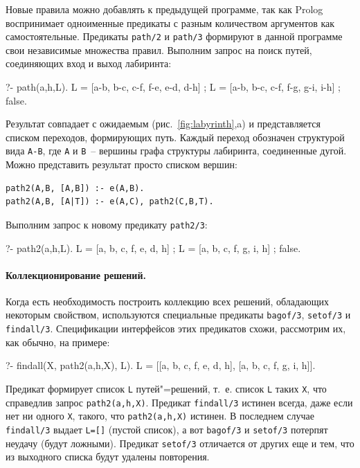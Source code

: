 \documentclass[a4paper,14pt, openany, twoside, draft]{extbook} %
\begin{document}
  Новые правила можно добавлять к предыдущей программе, так как Prolog воспринимает одноименные предикаты с разным количеством аргументов как самостоятельные.  Предикаты \texttt{path/2} и \texttt{path/3} формируют в данной программе свои независимые множества правил.  Выполним запрос на поиск путей, соединяющих вход и выход лабиринта:

\begin{proexp}
?- path(a,h,L).
L = [a-b, b-c, c-f, f-e, e-d, d-h] ;
L = [a-b, b-c, c-f, f-g, g-i, i-h] ;
false.
\end{proexp}

Результат совпадает с ожидаемым (рис.~\ref{fig:labyrinth},a) и представляется списком переходов, формирующих путь.  Каждый переход обозначен структурой вида \texttt{A-B}, где \texttt{A} и \texttt{B}~-- вершины графа структуры лабиринта, соединенные дугой.  Можно представить результат просто списком вершин:

\begin{verbatim}
path2(A,B, [A,B]) :- e(A,B).
path2(A,B, [A|T]) :- e(A,C), path2(C,B,T).
\end{verbatim}

\noindent{}Выполним запрос к новому предикату \texttt{path2/3}:

\begin{proexp}
?- path2(a,h,L).
L = [a, b, c, f, e, d, h] ;
L = [a, b, c, f, g, i, h] ;
false.
\end{proexp}

\paragraph{Коллекционирование решений.} Когда есть необходимость построить коллекцию всех решений, обладающих некоторым свойством, используются специальные предикаты \texttt{bagof/3}, \texttt{setof/3} и \texttt{findall/3}.  Спецификации интерфейсов этих предикатов схожи, рассмотрим их, как обычно, на примере:

\begin{proexp}
?- findall(X, path2(a,h,X), L).
L = [[a, b, c, f, e, d, h], [a, b, c, f, g, i, h]].
\end{proexp}

\noindent{}Предикат формирует список \texttt{L} путей"=решений, т.~е. список \texttt{L} таких \texttt{X}, что справедлив запрос \texttt{path2(a,h,X)}.  Предикат \texttt{findall/3} истинен всегда, даже если нет ни одного \texttt{X}, такого, что \texttt{path2(a,h,X)} истинен.  В последнем случае \texttt{findall/3} выдает \texttt{L=[]} (пустой список), а вот \texttt{bagof/3} и \texttt{setof/3} потерпят неудачу (будут ложными).  Предикат \texttt{setof/3} отличается от других еще и тем, что из выходного списка будут удалены повторения.
\end{document}
